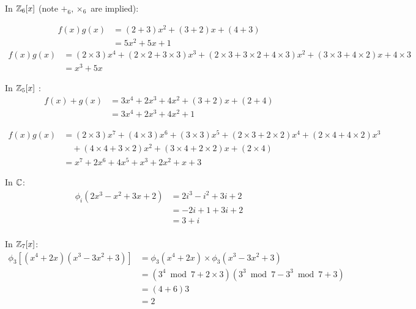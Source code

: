 \documentclass[class=article,crop=false]{standalone}
\begin{document}
\begin{problem}[22.3]
	In $ \mathbb{Z}_6[x]$ (note $ +_{ 6},\times _6 $ are implied):

	\begin{align*}
		f(x)g(x)&=(2+3 )x^2 + (3+2 ) x + (4+ 3)\\
		&= 5x^2 + 5x + 1 
	\end{align*}
	\begin{align*}
		f(x)g(x) &= (2 \times  3)x^{4} + (2\times  2 + 3 \times  3 ) x^3 + (2 \times 3 + 3\times 2 + 4\times 3 ) x^2 + (3\times 3+ 4 \times 2) x + 4\times 3\\
		&= x^3 + 5x 
	\end{align*}
\end{problem}

\begin{problem}[22.4]
	In $ \mathbb{Z}_5[x]$ :
\begin{align*}
	f(x)+g(x) &= 3x^{4} + 2x^3 + 4x^2 + (3+2) x + (2+4) \\
	&= 3x^{4} + 2x^3 + 4x^2 + 1 
\end{align*}

\begin{align*}
	f(x)g(x) &= (2\times 3) x^{7} + (4\times 3) x^{6} + (3 \times 3) x^{5} + (2 \times 3 + 2\times 2) x^{4} + (2\times 4 + 4\times 2) x^{3}\\ 
		 & \quad + (4\times 4 + 3\times 2) x^2 + (3\times 4 + 2\times 2)x + (2\times 4)\\
	&= x^{7}+ 2x^{6} + 4x^{5} + x^3 + 2x^2 + x +3 
\end{align*}
\end{problem}

\begin{problem}[22.8]
	In $ \mathbb{C}$:
\begin{align*}
	\phi_{i} (2x^3 - x^2 + 3x + 2) &= 2 i^{3} - i^2 + 3i + 2 \\
	&= -2 i + 1 + 3i + 2 \\
	&= 3+ i  \\
\end{align*}
\end{problem}

\begin{problem}[22.9]
	In $ \mathbb{Z}_7[x]$:
\begin{align*}
	\phi_3 [(x^{4} + 2x )(x^3-3x^2+3)] &= \phi_3(x^{4}+ 2x) \times \phi_3(x^3 - 3x^2 + 3) \\
					   &= (3^{4} \bmod 7 + 2\times 3) (3^{3} \bmod 7 - 3^{3} \bmod 7 + 3) \\
					   &= (4+6) 3 \\
					   &= 2 
\end{align*}
\end{problem}
\end{document}
